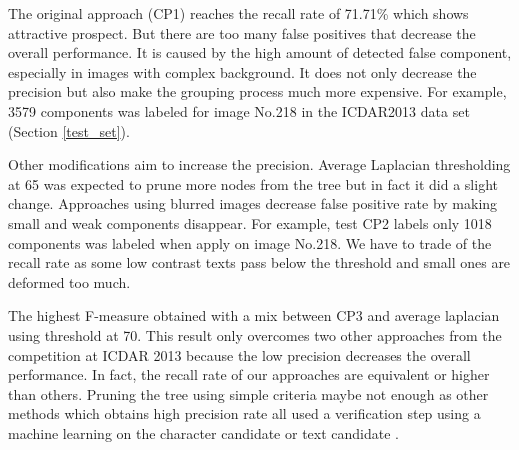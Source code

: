 The original approach (CP1) reaches the recall rate of 71.71\% which shows attractive prospect. But there are too many false positives that decrease the overall performance. It is caused by the high amount of detected false component, especially in images with complex background. It does not only decrease the precision but also make the grouping process much more expensive. For example, 3579 components was labeled for image No.218 in the ICDAR2013 data set (Section \ref{test_set}).


Other modifications aim to increase the precision. Average Laplacian thresholding at 65 was expected to prune more nodes from the tree but in fact it did a slight change. Approaches using blurred images decrease false positive rate by making small and weak components disappear. For example, test CP2 labels only 1018 components was labeled when apply on image No.218. We have to trade of the recall rate as some low contrast texts pass below the threshold and small ones are deformed too much.


The highest F-measure obtained with a mix between CP3 and average laplacian using threshold at 70. This result only overcomes two other approaches from the competition at ICDAR 2013 \cite{ICDAR2013} because the low precision decreases the overall performance. In fact, the recall rate of our approaches are equivalent or higher than others. Pruning the tree using simple criteria maybe not enough as other methods which obtains high precision rate all used a verification step using a machine learning on the character candidate or text candidate .

